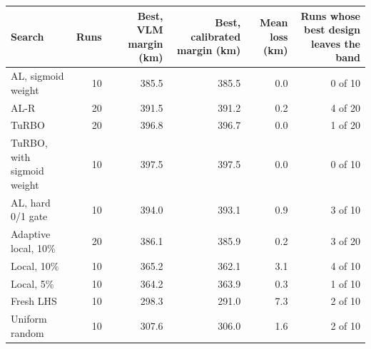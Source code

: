 \begin{tabular}{@{}lrrrrr@{}}
\toprule
Search & Runs & Best, VLM margin (km) & Best, calibrated margin (km) & Mean loss (km) & Runs whose best design leaves the band \\
\midrule
AL, sigmoid weight & 10 & 385.5 & 385.5 & 0.0 & 0 of 10 \\
AL-R & 20 & 391.5 & 391.2 & 0.2 & 4 of 20 \\
TuRBO & 20 & 396.8 & 396.7 & 0.0 & 1 of 20 \\
TuRBO, with sigmoid weight & 10 & 397.5 & 397.5 & 0.0 & 0 of 10 \\
AL, hard 0/1 gate & 10 & 394.0 & 393.1 & 0.9 & 3 of 10 \\
Adaptive local, 10\% & 20 & 386.1 & 385.9 & 0.2 & 3 of 20 \\
Local, 10\% & 10 & 365.2 & 362.1 & 3.1 & 4 of 10 \\
Local, 5\% & 10 & 364.2 & 363.9 & 0.3 & 1 of 10 \\
Fresh LHS & 10 & 298.3 & 291.0 & 7.3 & 2 of 10 \\
Uniform random & 10 & 307.6 & 306.0 & 1.6 & 2 of 10 \\
\bottomrule
\end{tabular}
